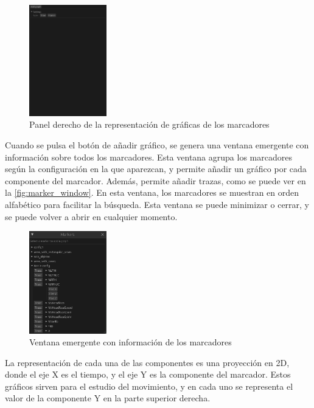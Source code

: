 \begin{figure}[H]
  \centering
  \includegraphics[width=0.3\textwidth]{imagenes/panel-dcho.png}
  \caption{Panel derecho de la representación de gráficas de los marcadores}
  \label{fig:panel_derecho}
\end{figure}

Cuando se pulsa el botón de añadir gráfico, se genera una ventana emergente con información sobre todos los marcadores. Esta ventana agrupa los marcadores según la configuración en la que aparezcan, y permite añadir un gráfico por cada componente del marcador. Además, permite añadir trazas, como se puede ver en la \autoref{fig:marker_window}. En esta ventana, los marcadores se muestran en orden alfabético para facilitar la búsqueda. Esta ventana se puede minimizar o cerrar, y se puede volver a abrir en cualquier momento. 

\begin{figure}[H]
  \centering
  \includegraphics[width=0.3\textwidth]{imagenes/markers-window.png}
  \caption{Ventana emergente con información de los marcadores}
  \label{fig:marker_window}
\end{figure}

La representación de cada una de las componentes es una proyección en 2D, donde el eje X es el tiempo, y el eje Y es la componente del marcador. Estos gráficos sirven para el estudio del movimiento, y en cada uno se representa el valor de la componente Y en la parte superior derecha.

